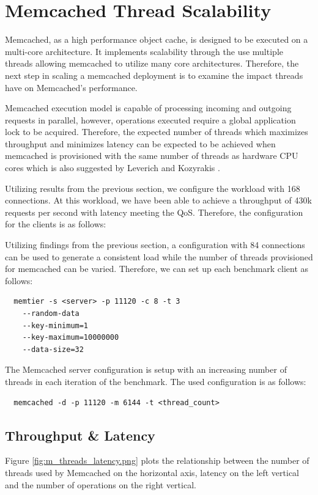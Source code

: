 \section{Memcached Thread Scalability}
Memcached, as a high performance object cache, is designed to be executed on a multi-core architecture. It implements scalability through the use multiple threads allowing memcached to utilize many core architectures. Therefore, the next step in scaling a memcached deployment is to examine the impact threads have on Memcached's performance.

Memcached execution model is capable of processing incoming and outgoing requests in parallel, however, operations executed require a global application lock to be acquired. Therefore, the expected number of threads which maximizes throughput and minimizes latency can be expected to be achieved when memcached is provisioned with the same number of threads as hardware CPU cores which is also suggested by Leverich and Kozyrakis \cite{leverich2014reconciling}.

Utilizing results from the previous section, we configure the workload with 168 connections. At this workload, we have been able to achieve a throughput of 430k requests per second with latency meeting the QoS. Therefore, the configuration for the clients is as follows:

Utilizing findings from the previous section, a configuration with 84 connections can be used to generate a consistent load while the number of threads provisioned for memcached can be varied. Therefore, we can set up each benchmark client as follows:

\begin{lstlisting}
  memtier -s <server> -p 11120 -c 8 -t 3
    --random-data
    --key-minimum=1
    --key-maximum=10000000
    --data-size=32
\end{lstlisting}

The Memcached server configuration is setup with an increasing number of threads in each iteration of the benchmark. The used configuration is as follows:
\begin{lstlisting}
  memcached -d -p 11120 -m 6144 -t <thread_count>
\end{lstlisting}


\subsection{Throughput \& Latency}

Figure \ref{fig:m_threads_latency.png} plots the relationship between the number of threads used by Memcached on the horizontal axis, latency on the left vertical and the number of operations on the right vertical.

